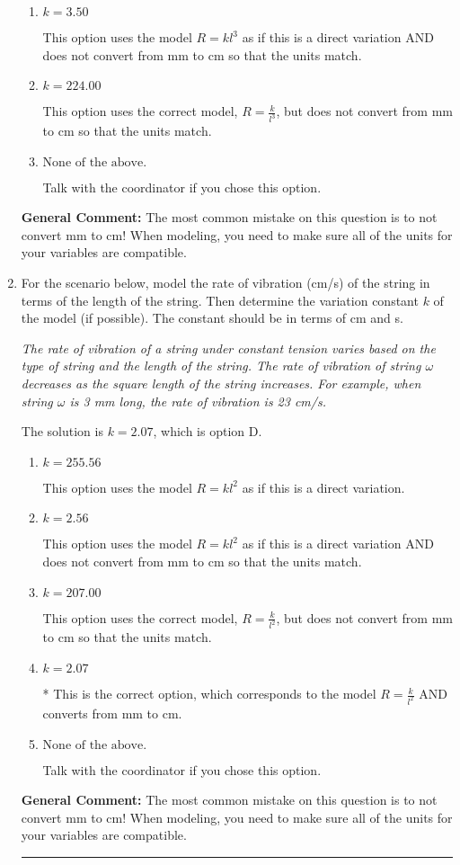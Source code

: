 \documentclass{extbook}[14pt]
\newcommand{\litem}[1]{\item #1

\rule{\textwidth}{0.4pt}}
\begin{document}
\begin{enumerate}
{\begin{enumerate}[label=\Alph*.]
* This is the correct option, which corresponds to the model $R = \frac{k}{l^{3}}$ AND converts from mm to cm.
\item \( k = 3.50 \)

This option uses the model $R = kl^{3}$ as if this is a direct variation AND does not convert from mm to cm so that the units match.
\item \( k = 224.00 \)

This option uses the correct model, $R = \frac{k}{l^{3}}$, but does not convert from mm to cm so that the units match.
\item \( \text{None of the above.} \)

Talk with the coordinator if you chose this option.
\end{enumerate}

\textbf{General Comment:} The most common mistake on this question is to not convert mm to cm! When modeling, you need to make sure all of the units for your variables are compatible.
}
\litem{
For the scenario below, model the rate of vibration (cm/s) of the string in terms of the length of the string. Then determine the variation constant $k$ of the model (if possible). The constant should be in terms of cm and s.

\begin{center}
    \textit{ The rate of vibration of a string under constant tension varies based on the type of string and the length of the string. The rate of vibration of string $\omega$ decreases as the square length of the string increases. For example, when string $\omega$ is 3 mm long, the rate of vibration is 23 cm/s. }
\end{center}
The solution is \( k = 2.07 \), which is option D.\begin{enumerate}[label=\Alph*.]
\item \( k = 255.56 \)

This option uses the model $R = kl^{2}$ as if this is a direct variation.
\item \( k = 2.56 \)

This option uses the model $R = kl^{2}$ as if this is a direct variation AND does not convert from mm to cm so that the units match.
\item \( k = 207.00 \)

This option uses the correct model, $R = \frac{k}{l^{2}}$, but does not convert from mm to cm so that the units match.
\item \( k = 2.07 \)

* This is the correct option, which corresponds to the model $R = \frac{k}{l^{2}}$ AND converts from mm to cm.
\item \( \text{None of the above.} \)

Talk with the coordinator if you chose this option.
\end{enumerate}

\textbf{General Comment:} The most common mistake on this question is to not convert mm to cm! When modeling, you need to make sure all of the units for your variables are compatible.
}
\end{enumerate}
\end{document}
